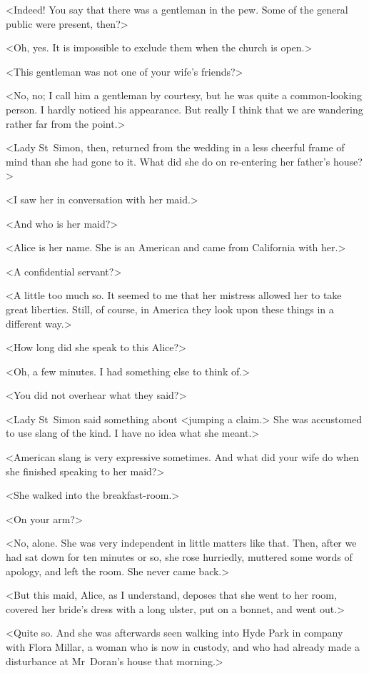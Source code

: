 <Indeed! You say that there was a gentleman in the pew. Some of the general public were present, then?>

<Oh, yes. It is impossible to exclude them when the church is open.>

<This gentleman was not one of your wife's friends?>

<No, no; I call him a gentleman by courtesy, but he was quite a common-looking person. I hardly noticed his appearance. But really I think that we are wandering rather far from the point.>

<Lady St~Simon, then, returned from the wedding in a less cheerful frame of mind than she had gone to it. What did she do on re-entering her father's house?>

<I saw her in conversation with her maid.>

<And who is her maid?>

<Alice is her name. She is an American and came from California with her.>

<A confidential servant?>

<A little too much so. It seemed to me that her mistress allowed her to take great liberties. Still, of course, in America they look upon these things in a different way.>

<How long did she speak to this Alice?>

<Oh, a few minutes. I had something else to think of.>

<You did not overhear what they said?>

<Lady St~Simon said something about <jumping a claim.> She was accustomed to use slang of the kind. I have no idea what she meant.>

<American slang is very expressive sometimes. And what did your wife do when she finished speaking to her maid?>

<She walked into the breakfast-room.>

<On your arm?>

<No, alone. She was very independent in little matters like that. Then, after we had sat down for ten minutes or so, she rose hurriedly, muttered some words of apology, and left the room. She never came back.>

<But this maid, Alice, as I understand, deposes that she went to her room, covered her bride's dress with a long ulster, put on a bonnet, and went out.>

<Quite so. And she was afterwards seen walking into Hyde Park in company with Flora Millar, a woman who is now in custody, and who had already made a disturbance at Mr~Doran's house that morning.>


